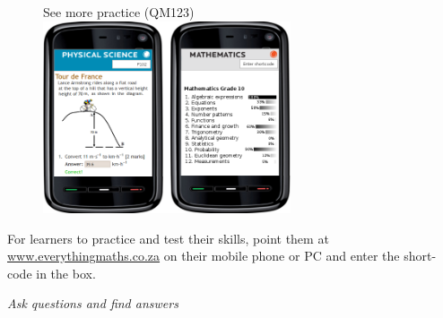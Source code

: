 {\begin{figure}[h]
\begin{center}
See more practice  (QM123)\\ 
\includegraphics[width=0.65\textwidth]{../title_images/practicephones.png}
\end{center}
\end{figure}
\par


For learners to practice and test their skills, point them at \underline{www.everythingmaths.co.za} on their mobile phone or PC and enter the short-code in the box.\par

\vspace*{1cm}
}

{\normalfont\sffamily\fontsize{22}\normalfont\itshape Ask questions and find answers} \par

